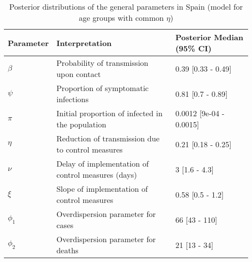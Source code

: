 \begin{table}[ht]
\centering
\begin{tabular}{lp{9cm}p{3cm}}
  \hline
Parameter & Interpretation & Posterior Median (95\% CI) \\ 
  \hline
$\beta$ & Probability of transmission upon contact & 0.39 [0.33 - 0.49] \\ 
  $\psi$ & Proportion of symptomatic infections & 0.81 [0.7 - 0.89] \\ 
  $\pi$ & Initial proportion of infected in the population & 0.0012 [9e-04 - 0.0015] \\ 
  $\eta$ & Reduction of transmission due to control measures & 0.21 [0.18 - 0.25] \\ 
  $\nu$ & Delay of implementation of control measures (days) & 3 [1.6 - 4.3] \\ 
  $\xi$ & Slope of implementation of control measures & 0.58 [0.5 - 1.2] \\ 
  $\phi_1$ & Overdispersion parameter for cases & 66 [43 - 110] \\ 
  $\phi_2$ & Overdispersion parameter for deaths & 21 [13 - 34] \\ 
   \hline
\end{tabular}
\caption{Posterior distributions of the general parameters in Spain (model for age groups with common $\eta$)} 
\label{tab:ParamTableSpain_Age_CommonEta}
\end{table}
